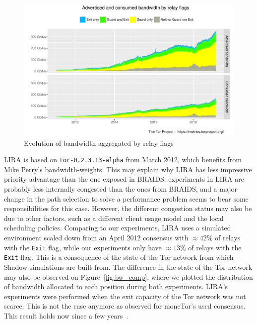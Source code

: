 \begin{figure}
  \includegraphics[scale=0.415]{images/bandwidth-flags-2011-01-01-2019-02-25.pdf}
  \caption{Evolution of bandwidth aggregated by relay flags} \label{fig:bw_inequalities}
\end{figure}

LIRA is based on \texttt{tor-0.2.3.13-alpha} from March 2012, which benefits
from Mike Perry's bandwidth-weights. This may explain why LIRA has less impressive priority advantage than the one exposed in BRAIDS: experiments in LIRA are probably less internally congested than the ones from BRAIDS, and a major change in the path selection to solve a performance problem seems to bear some responsibilities for this case. However, the different congestion status may also be due to other factors, such as a different client usage model and the local scheduling policies. Comparing to our experiments, LIRA uses a simulated environment scaled down from an April 2012 consensus with $\approx 42\%$ of relays with the \texttt{Exit} flag, while our experiments only have $\approx 13\%$ of relays with the \texttt{Exit} flag. This is a consequence of the state of the Tor network from which Shadow simulations are built from. The difference in the state of the Tor network may also be observed on Figure~\ref{fig:bw_comp}, where we plotted the distribution of bandwidth allocated to each position during both experiments. LIRA's experiments were performed when the exit capacity of the Tor network was not scarce. This is not the case anymore as observed for moneTor's used consensus. This result holds now since a few years~\cite{waterfilling-pets2017}.


